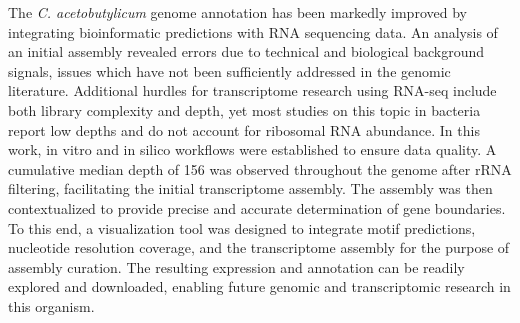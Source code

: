 

The {\it C. acetobutylicum} genome annotation has been markedly improved by integrating bioinformatic predictions with RNA sequencing data. An analysis of an initial assembly revealed errors due to technical and biological background signals, issues which have not been sufficiently addressed in the genomic literature. Additional hurdles for transcriptome research using RNA-seq include both library complexity and depth, yet most studies on this topic in bacteria report low depths and do not account for ribosomal RNA abundance. In this work, in vitro and in silico workflows were established to ensure data quality. A cumulative median depth of 156 was observed throughout the genome after rRNA filtering, facilitating the initial transcriptome assembly. The assembly was then contextualized to provide precise and accurate determination of gene boundaries. To this end, a visualization tool was designed to integrate motif predictions, nucleotide resolution coverage, and the transcriptome assembly for the purpose of assembly curation. The resulting expression and annotation can be readily explored and downloaded, enabling future genomic and transcriptomic research in this organism.

